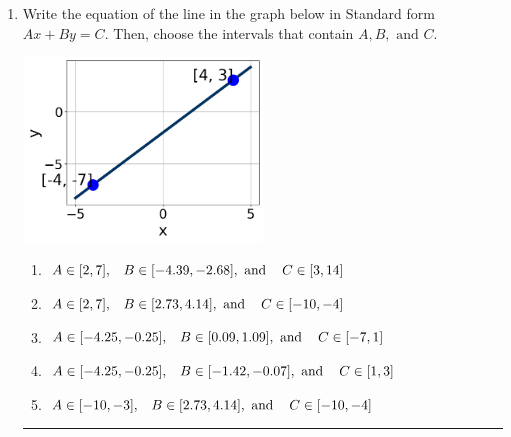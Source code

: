 \documentclass[14pt]{extbook}
\newcommand{\litem}[1]{\item#1\hspace*{-1cm}\rule{\textwidth}{0.4pt}}
\begin{document}
\begin{enumerate}
{\begin{enumerate}[label=\Alph*.]
\end{enumerate} }
\litem{
Write the equation of the line in the graph below in Standard form $Ax+By=C$. Then, choose the intervals that contain $A, B, \text{ and } C$.
\begin{center}
    \includegraphics[width=0.5\textwidth]{../Figures/linearGraphToStandardCopyC.png}
\end{center}
\begin{enumerate}[label=\Alph*.]
\item \( A \in [2, 7], \hspace{3mm} B \in [-4.39, -2.68], \text{ and } \hspace{3mm} C \in [3, 14] \)
\item \( A \in [2, 7], \hspace{3mm} B \in [2.73, 4.14], \text{ and } \hspace{3mm} C \in [-10, -4] \)
\item \( A \in [-4.25, -0.25], \hspace{3mm} B \in [0.09, 1.09], \text{ and } \hspace{3mm} C \in [-7, 1] \)
\item \( A \in [-4.25, -0.25], \hspace{3mm} B \in [-1.42, -0.07], \text{ and } \hspace{3mm} C \in [1, 3] \)
\item \( A \in [-10, -3], \hspace{3mm} B \in [2.73, 4.14], \text{ and } \hspace{3mm} C \in [-10, -4] \)


\end{enumerate}}
\end{enumerate}
\end{document}
